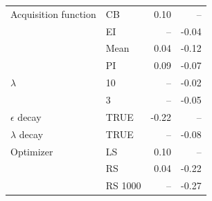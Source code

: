 \begin{table}[H]
\begin{tabular}{llrr}
    Acquisition function & CB          & 0.10           & --             \\
                         & EI          & --             & -0.04          \\
                         & Mean        & 0.04           & -0.12          \\
                         & PI          & 0.09           & -0.07          \\
    $\lambda$            & 10          & --             & -0.02          \\
                         & 3           & --             & -0.05          \\
    $\epsilon$ decay     & TRUE        & -0.22          & --             \\
    $\lambda$ decay      & TRUE        & --             & -0.08          \\
    Optimizer            & LS          & 0.10           & --             \\
                         & RS          & 0.04           & -0.22          \\
                         & RS 1000     & --             & -0.27          \\
    \bottomrule
  \end{tabular}
\end{table}